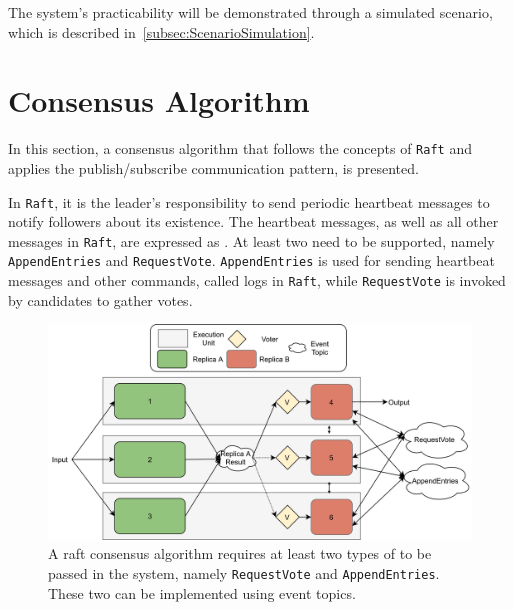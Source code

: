 The system's practicability will be demonstrated through a simulated scenario, which is described in~\autoref{subsec:ScenarioSimulation}.

\section{Consensus Algorithm}
\label{sec:ImpConsensusAlgorithm}

In this section, a consensus algorithm that follows the concepts of \texttt{Raft} and applies the  publish/subscribe communication pattern, is presented.

In \texttt{Raft}, it is the leader's responsibility to send periodic heartbeat messages to notify followers about its existence.
The heartbeat messages, as well as all other messages in \texttt{Raft}, are expressed as .
At least two  need to be supported, namely \texttt{AppendEntries} and \texttt{RequestVote}.
\texttt{AppendEntries} is used for sending heartbeat messages and other commands, called logs in \texttt{Raft}, while \texttt{RequestVote} is invoked by candidates to gather votes.

\begin{figure}[!hb]
	\centering
	\includegraphics[width=0.9\linewidth]{images/ThreeEUConsensusDDS}
	\caption{A raft consensus algorithm requires at least two types of  to be passed in the system, namely \texttt{RequestVote} and \texttt{AppendEntries}. These two can be implemented using  event topics.}
	\label{fig:ThreeRepConsensusDDS}
\end{figure}

